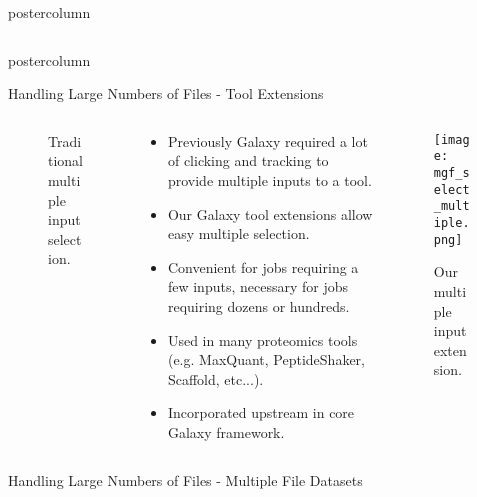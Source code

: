 \documentclass[final]{beamer}
\begin{document}
\begin{frame}
\begin{columns}
\begin{column}{.67\textwidth}
\begin{beamercolorbox}[center,wd=\textwidth]{postercolumn}
\begin{minipage}[T]{.98\textwidth}
{\begin{columns}
\begin{column}{.60\textwidth}
\begin{beamercolorbox}[center,wd=\textwidth]{postercolumn}
\begin{minipage}[T]{\textwidth}
{\begin{block}{Handling Large Numbers of Files - Tool Extensions}
\begin{columns}
\begin{column}{.2\textwidth}
\begin{figure}
                                \caption{Traditional multiple input selection.}
                              \end{figure}
                            \end{column}
                            \begin{column}{.59\textwidth}
                            \begin{itemize}
                              \item Previously Galaxy required a lot of clicking and tracking to provide multiple inputs to a tool.
                              \item Our Galaxy tool extensions allow easy multiple selection.
                              \item Convenient for jobs requiring a few inputs, necessary for jobs requiring dozens or hundreds.
                              \item Used in many proteomics tools (e.g. MaxQuant, PeptideShaker, Scaffold, etc...).
                              \item Incorporated upstream in core Galaxy framework.
                            \end{itemize}
                            \end{column}
                            \begin{column}{.2\textwidth}
                              \begin{figure}
                                \texttt{[image: mgf\_select\_multiple.png]}
                                \caption{Our multiple input extension.}
                              \end{figure}              
                            \end{column}
                          \end{columns}            
                        \end{block}
                        \vfill
                      }
                    \end{minipage}
                  \end{beamercolorbox}
                \end{column}      
              \end{columns}
              \vfill
              \begin{block}{Handling Large Numbers of Files - Multiple File Datasets}
                \begin{columns}

\end{columns}
\end{block}}
\end{minipage}
\end{beamercolorbox}
\end{column}
\end{columns}
\end{frame}
\end{document}
